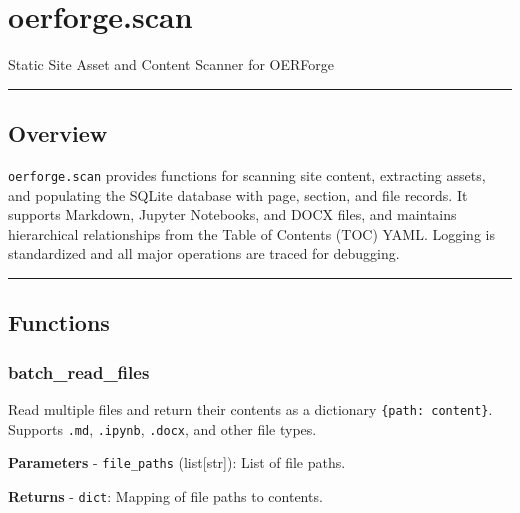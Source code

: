 \section{oerforge.scan}\label{oerforge.scan}

Static Site Asset and Content Scanner for OERForge

\begin{center}\rule{0.5\linewidth}{0.5pt}\end{center}

\subsection{Overview}\label{overview}

\texttt{oerforge.scan} provides functions for scanning site content,
extracting assets, and populating the SQLite database with page,
section, and file records. It supports Markdown, Jupyter Notebooks, and
DOCX files, and maintains hierarchical relationships from the Table of
Contents (TOC) YAML. Logging is standardized and all major operations
are traced for debugging.

\begin{center}\rule{0.5\linewidth}{0.5pt}\end{center}

\subsection{Functions}\label{functions}

\subsubsection{batch\_read\_files}\label{batch_read_files}

\begin{Shaded}
\begin{Highlighting}[]
\end{Highlighting}
\end{Shaded}

Read multiple files and return their contents as a dictionary
\texttt{\{path:\ content\}}. Supports \texttt{.md}, \texttt{.ipynb},
\texttt{.docx}, and other file types.

\textbf{Parameters} - \texttt{file\_paths} (list{[}str{]}): List of file
paths.

\textbf{Returns} - \texttt{dict}: Mapping of file paths to contents.

